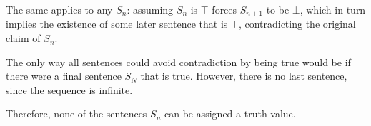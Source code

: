 \documentclass[12pt]{article}
\begin{document}
\begin{enumerate}[left=0pt, itemsep=2em, parsep=1em]
    The same applies to any $S_n$: assuming $S_n$ is $\top$ forces $S_{n+1}$ to be $\bot$, which in turn implies the existence of some later sentence that is $\top$, contradicting the original claim of $S_n$.
    
    The only way all sentences could avoid contradiction by being true would be if there were a final sentence $S_N$ that is true. However, there is no last sentence, since the sequence is infinite.
    
    Therefore, none of the sentences $S_n$ can be assigned a truth value.
\end{enumerate}
\end{document}
